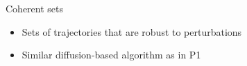 \documentclass[11pt,aspectratio=169]{beamer}
\begin{document}
%
%
%
%
%
%
\begin{frame}{Coherent sets}
  \begin{itemize}
    \item<1-> Sets of trajectories that are robust to perturbations
    \item<2-> Similar diffusion-based algorithm as in P1
  \end{itemize}
    \centering
  \coherentsetsfigure
\end{frame}
\end{document}
